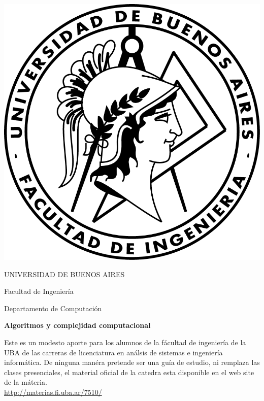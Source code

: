 \documentclass[12pt]{book}
\begin{document}
\thispagestyle{empty}

\begin {center}

\includegraphics[scale=.4]{Logo-fiuba_big.png}

\medskip
UNIVERSIDAD DE BUENOS AIRES

Facultad de Ingenier\'ia

Departamento de Computaci\'on


\vspace{3cm}


\textbf{\large Algoritmos y complejidad computacional}

\vspace{2cm}


Este es un modesto aporte para los alumnos de la f\'acultad de ingenier\'ia  de la UBA de las carreras de licenciatura en an\'alsis de sistemas e ingenier\'ia inform\'atica.
De ninguna man\'era pretende ser una gu\'ia de estudio, ni remplaza las clases presenciales, el material oficial de la catedra esta disponible en el web site de la m\'ateria.
\\
\url{http://materias.fi.uba.ar/7510/}

\end {center}


\vspace{2.5cm}
\end{document}
